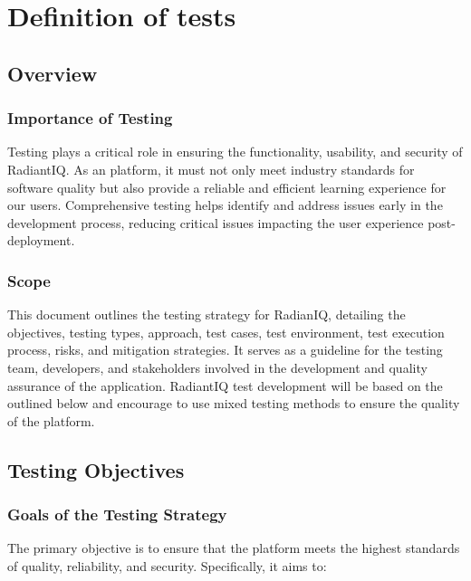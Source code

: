 \section{Definition of tests} \label{definition_of_tests}

	\subsection{Overview}

		\subsubsection{Importance of Testing}

		Testing plays a critical role in ensuring the functionality, usability, and security of RadiantIQ. As an platform, it must not only meet industry standards for software quality but also provide a reliable and efficient learning experience for our users. Comprehensive testing helps identify and address issues early in the development process, reducing critical issues impacting the user experience post-deployment.

		\subsubsection{Scope}

		This document outlines the testing strategy for RadianIQ, detailing the objectives, testing types, approach, test cases, test environment, test execution process, risks, and mitigation strategies. It serves as a guideline for the testing team, developers, and stakeholders involved in the development and quality assurance of the application. RadiantIQ test development will be based on the outlined below and encourage to use mixed testing methods to ensure the quality of the platform.
		
		
	\subsection{Testing Objectives}
	
		\subsubsection{Goals of the Testing Strategy}
		
		The primary objective is to ensure that the platform meets the highest standards of quality, reliability, and security. Specifically, it aims to:
		
